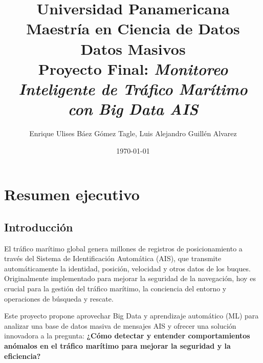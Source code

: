 \documentclass[10pt]{article}
\title{Universidad Panamericana \\ Maestría en Ciencia de Datos \\ Datos Masivos \\ 
    \vspace{0.5cm} Proyecto Final: \textit{Monitoreo Inteligente de Tráfico Marítimo con Big Data AIS}}
\author{Enrique Ulises Báez Gómez Tagle, Luis Alejandro Guillén Alvarez}
\date{\today}
\begin{document}
\maketitle

\tableofcontents

\newpage

\section{Resumen ejecutivo}
\subsection{Introducción} 

El tráfico marítimo global genera millones de registros de posicionamiento a través del Sistema de Identificación Automática (AIS), que transmite automáticamente la identidad, posición, velocidad y otros datos de los buques. Originalmente implementado para mejorar la seguridad de la navegación, hoy es crucial para la gestión del tráfico marítimo, la conciencia del entorno y operaciones de búsqueda y rescate.

Este proyecto propone aprovechar Big Data y aprendizaje automático (ML) para analizar una base de datos masiva de mensajes AIS y ofrecer una solución innovadora a la pregunta: \textbf{¿Cómo detectar y entender comportamientos anómalos en el tráfico marítimo para mejorar la seguridad y la eficiencia?}
\end{document}
